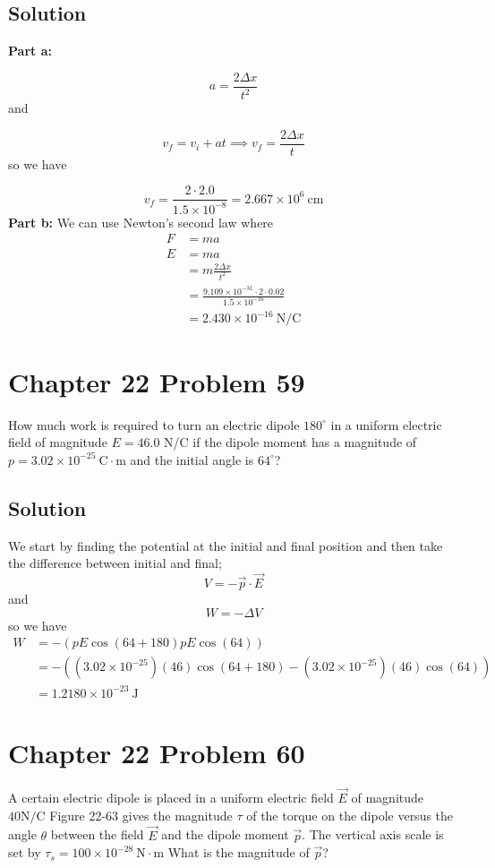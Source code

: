 \documentclass{article}
\newcommand{\m}{\text{m}}
\newcommand{\centi}{\text{c}}
\newcommand{\N}{\text{N}}
\newcommand{\J}{\text{J}}
\newcommand{\C}{\text{C}}
\begin{document}
\subsection*{Solution}
\textbf{Part a:}

\[
	a = \frac{2\Delta x}{t^2}
\]
and

\[
	v_f = v_i + at \implies v_f = \frac{2\Delta x}{t} 
\]
so we have

\[
	v_f = \frac{2\cdot 2.0}{1.5 \times 10^{-8}} = \boxed{2.667 \times 10^6\ \centi\m}
\]
\textbf{Part b:} We can use Newton's second law where
\begin{align*}
	F &= m a \\
	E &= m a \\
	&= m \frac{2\Delta x}{t^2} \\
	&= \frac{9.109 \times 10^{-31} \cdot 2 \cdot 0.02}{1.5 \times 10^{-16}} \\
	&= \boxed{2.430\times10^{-16} \ \N/\C}
\end{align*}

\section*{Chapter 22 Problem 59}
How much work is required to turn an electric dipole $180^\circ$ in a uniform electric field of magnitude $E = 46.0$ N/C if the dipole moment has a magnitude of $p=3.02 \times 10^{-25}\ \C \cdot \m$ and the initial angle is $64^\circ$?

\subsection*{Solution}
We start by finding the potential at the initial and final position and then take the difference between initial and final;
\[
	V = - \vec p \cdot \vec E
\]
and
\[
	W = -\Delta V
\]
so we have
\begin{align*}
	W &= -\left(pE \cos(64+180) pE \cos(64) \right) \\
	  &= -\left(\left(3.02 \times 10^{-25}\right)\left( 46\right) \cos(64+180) - \left(3.02 \times 10^{-25}\right)\left( 46\right) \cos(64) \right) \\ 
	  &= \boxed{1.2180\times10^{-23}\ \J}
\end{align*}

\section*{Chapter 22 Problem 60}
A certain electric dipole is placed in a uniform electric field $\vec E$ of magnitude $40 \N/\C$ Figure 22-63 gives the magnitude $\tau$ of the torque on the dipole versus the angle $\theta$ between the field $\vec E$ and the dipole moment $\vec p$. The vertical axis scale is set by $\tau_s = 100 \times 10^{-28}\ \N \cdot \m $ What is the magnitude of $\vec p$?
\end{document}
